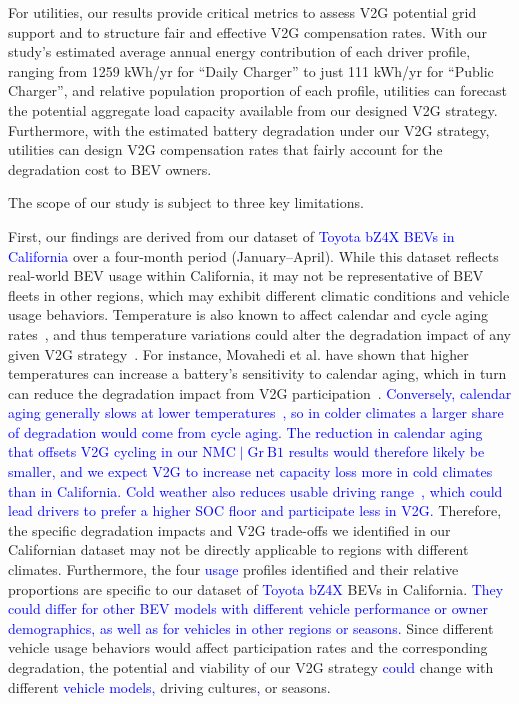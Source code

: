\documentclass[pdflatex,sn-nature]{sn-jnl}%
\theoremstyle{thmstyleone}%
\theoremstyle{thmstyletwo}%
\theoremstyle{thmstylethree}%
\begin{document}
For utilities, our results provide critical metrics to assess V2G potential grid support and to structure fair and effective V2G compensation rates. With our study's estimated average annual energy contribution of each driver profile, ranging from 1259 kWh/yr for ``Daily Charger'' to just 111 kWh/yr for ``Public Charger'', and relative population proportion of each profile, utilities can forecast the potential aggregate load capacity available from our designed V2G strategy. Furthermore, with the estimated battery degradation under our V2G strategy, utilities can design V2G compensation rates that fairly account for the degradation cost to BEV owners.


The scope of our study is subject to three key limitations.


First, our findings are derived from our dataset of \textcolor{blue}{Toyota bZ4X BEVs in California} over a four-month period (January--April). While this dataset reflects real-world BEV usage within California, it may not be representative of BEV fleets in other regions, which may exhibit different climatic conditions and vehicle usage behaviors. Temperature is also known to affect calendar and cycle aging rates~\cite{Naumann2018, Smith2021, Dubarry2018}, and thus temperature variations could alter the degradation impact of any given V2G strategy~\cite{Hamid_V2G, Guo2019, Thingvad2021}. For instance, Movahedi et al. have shown that higher temperatures can increase a battery's sensitivity to calendar aging, which in turn can reduce the degradation impact from V2G participation~\cite{Hamid_V2G}. \textcolor{blue}{Conversely, calendar aging generally slows at lower temperatures~\cite{gasper2023degradation, Hamid_V2G}, so in colder climates a larger share of degradation would come from cycle aging. The reduction in calendar aging that offsets V2G cycling in our $\mathrm{NMC}\mid\mathrm{Gr~B1}$ results would therefore likely be smaller, and we expect V2G to increase net capacity loss more in cold climates than in California. Cold weather also reduces usable driving range~\cite{Steinstraeter2021}, which could lead drivers to prefer a higher SOC floor and participate less in V2G.} Therefore, the specific degradation impacts and V2G trade-offs we identified in our Californian dataset may not be directly applicable to regions with different climates. Furthermore, the four \textcolor{blue}{usage} profiles identified and their relative proportions are specific to our dataset of \textcolor{blue}{Toyota bZ4X} BEVs in California. \textcolor{blue}{They could differ for other BEV models with different vehicle performance or owner demographics, as well as for vehicles in other regions or seasons.} Since different vehicle usage behaviors would affect participation rates and the corresponding degradation, the potential and viability of our V2G strategy \textcolor{blue}{could} change with different \textcolor{blue}{vehicle models,} driving cultures\textcolor{blue}{,} or seasons.
\end{document}
